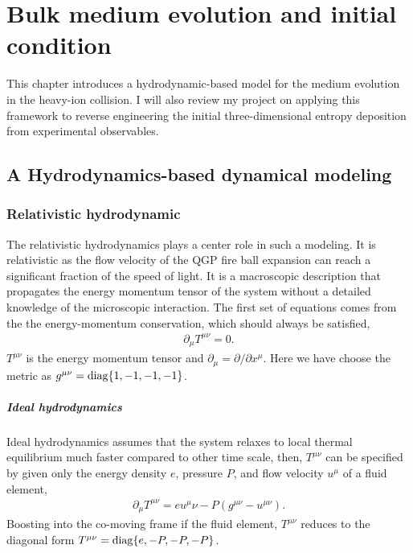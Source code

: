 \chapter{Bulk medium evolution and initial condition}
\label{chapter:simulation}
This chapter introduces a hydrodynamic-based model for the medium evolution in the heavy-ion collision.
I will also review my project on applying this framework to reverse engineering the initial three-dimensional entropy deposition from experimental observables.

\section{A Hydrodynamics-based dynamical modeling}
\subsection{Relativistic hydrodynamic}
The relativistic hydrodynamics plays a center role in such a modeling.
It is relativistic as the flow velocity of the QGP fire ball expansion can reach a significant fraction of the speed of light.
It is a macroscopic description that propagates the energy momentum tensor of the system without a detailed knowledge of the microscopic interaction.
The first set of equations comes from the the energy-momentum conservation, which should always be satisfied,
\begin{eqnarray}\label{eq:hydro:0-4}
\partial_\mu T^{\mu\nu} = 0.
\end{eqnarray}
$T^{\mu\nu}$ is the energy momentum tensor and $\partial_\mu = \partial/\partial x^\mu$. 
Here we have choose the metric as $g^{\mu\nu} = \operatorname{diag}\{1, -1, -1, -1\}$.

\paragraph{Ideal hydrodynamics} Ideal hydrodynamics assumes that the system relaxes to local thermal equilibrium much faster compared to other time scale, then, $T^{\mu\nu}$ can be specified by given only the energy density $e$, pressure $P$, and flow velocity $u^\mu$ of a fluid element,
\begin{eqnarray}
\partial_\mu T^{\mu\nu} = e u^\mu \nu - P (g^{\mu\nu}-u^{\mu\nu}).
\end{eqnarray}
Boosting into the co-moving frame if the fluid element, $T^{\mu\nu}$ reduces to the diagonal form $T^{\mu\nu} = \operatorname{diag}\{e, -P, -P, -P\}$.

